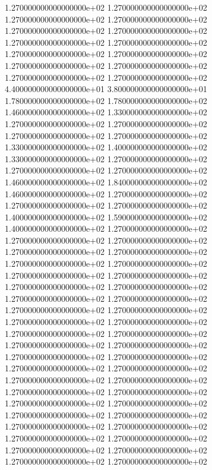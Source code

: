 1.270000000000000000e+02 1.270000000000000000e+02 1.270000000000000000e+02 1.270000000000000000e+02 1.270000000000000000e+02 1.270000000000000000e+02 1.270000000000000000e+02 1.270000000000000000e+02 1.270000000000000000e+02 1.270000000000000000e+02 1.270000000000000000e+02 1.270000000000000000e+02 1.270000000000000000e+02 1.270000000000000000e+02 4.400000000000000000e+01 3.800000000000000000e+01 1.780000000000000000e+02 1.780000000000000000e+02 1.460000000000000000e+02 1.330000000000000000e+02 1.270000000000000000e+02 1.270000000000000000e+02 1.270000000000000000e+02 1.270000000000000000e+02 1.330000000000000000e+02 1.400000000000000000e+02 1.330000000000000000e+02 1.270000000000000000e+02 1.270000000000000000e+02 1.270000000000000000e+02 1.460000000000000000e+02 1.840000000000000000e+02 1.460000000000000000e+02 1.270000000000000000e+02 1.270000000000000000e+02 1.270000000000000000e+02 1.400000000000000000e+02 1.590000000000000000e+02 1.400000000000000000e+02 1.270000000000000000e+02 1.270000000000000000e+02 1.270000000000000000e+02 1.270000000000000000e+02 1.270000000000000000e+02 1.270000000000000000e+02 1.270000000000000000e+02 1.270000000000000000e+02 1.270000000000000000e+02 1.270000000000000000e+02 1.270000000000000000e+02 1.270000000000000000e+02 1.270000000000000000e+02 1.270000000000000000e+02 1.270000000000000000e+02 1.270000000000000000e+02 1.270000000000000000e+02 1.270000000000000000e+02 1.270000000000000000e+02 1.270000000000000000e+02 1.270000000000000000e+02 1.270000000000000000e+02 1.270000000000000000e+02 1.270000000000000000e+02 1.270000000000000000e+02 1.270000000000000000e+02 1.270000000000000000e+02 1.270000000000000000e+02 1.270000000000000000e+02 1.270000000000000000e+02 1.270000000000000000e+02 1.270000000000000000e+02 1.270000000000000000e+02 1.270000000000000000e+02 1.270000000000000000e+02 1.270000000000000000e+02 1.270000000000000000e+02 1.270000000000000000e+02 1.270000000000000000e+02 1.270000000000000000e+02 1.270000000000000000e+02
